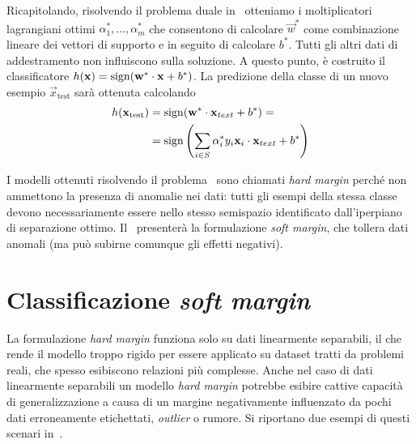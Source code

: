 Ricapitolando, risolvendo il problema duale in~ otteniamo i moltiplicatori lagrangiani ottimi $\alpha_1^*, ..., \alpha_m^*$ che consentono di calcolare $\Vec{w}^*$ come combinazione lineare dei vettori di supporto e in seguito di calcolare $b^*$. 
Tutti gli altri dati di addestramento non influiscono sulla soluzione. 
A questo punto, è costruito il classificatore $h(\Vec{x}) = \sign(\Vec{w}^*\cdot \Vec{x} +b^*)$.
La predizione della classe di un nuovo esempio $\Vec{x}_\text{test}$ sarà ottenuta calcolando 
\begin{align*}
h(\Vec{x}_\text{test})  &= \sign(\Vec{w}^*\cdot\vec{x}_{text} +b^*) =\\
                        &= \sign\left(\sum_{i\in S} \alpha_i^*y_i \vec{x}_i \cdot \vec{x}_{text} + b^*\right)
\end{align*}

I modelli ottenuti risolvendo il problema~ sono chiamati \emph{hard margin} perché non ammettono la presenza di anomalie nei dati: tutti gli esempi della stessa classe devono necessariamente essere nello stesso semispazio identificato dall'iperpiano di separazione ottimo. Il~ presenterà la formulazione \emph{soft margin}, che tollera dati anomali (ma può subirne comunque gli effetti negativi). 

\section{Classificazione \emph{soft margin}}\label{sec:soft_margin_classifier}
La formulazione \emph{hard margin} funziona solo su dati linearmente separabili, il che rende il modello troppo rigido per essere applicato su dataset tratti da problemi reali, che spesso esibiscono relazioni più complesse. 
Anche nel caso di dati linearmente separabili un modello \emph{hard margin} potrebbe esibire cattive capacità di generalizzazione a causa di un margine negativamente influenzato da pochi dati erroneamente etichettati, \emph{outlier} o rumore.
Si riportano due esempi di questi scenari in~.

